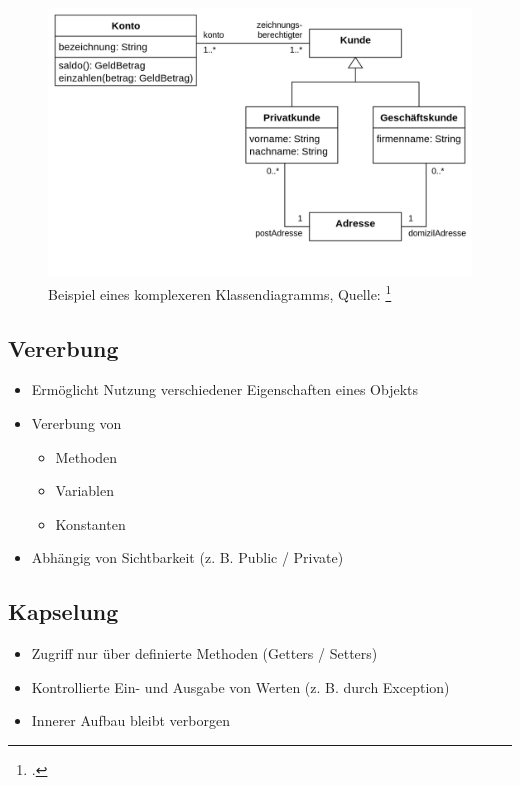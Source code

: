 \begin{figure}
    \includegraphics[width=\linewidth]{bilder/klassendiagramm.png}
    \caption{Beispiel eines komplexeren Klassendiagramms, Quelle: \footcite[][]{wikipediabenutzerUMLKlassendiagramm}}
    \label{fig:bsp_klassendiagramm}
\end{figure}

\subsection{Vererbung}
\begin{itemize}
    \item Ermöglicht Nutzung verschiedener Eigenschaften eines Objekts
    \item Vererbung von
    \begin{itemize}
        \item Methoden
        \item Variablen
        \item Konstanten
    \end{itemize}
    \item Abhängig von Sichtbarkeit (z. B. Public / Private)
\end{itemize}

\subsection{Kapselung}
\begin{itemize}
    \item Zugriff nur über definierte Methoden (Getters / Setters)
    \item Kontrollierte Ein- und Ausgabe von Werten (z. B. durch Exception)
    \item Innerer Aufbau bleibt verborgen
\end{itemize}


